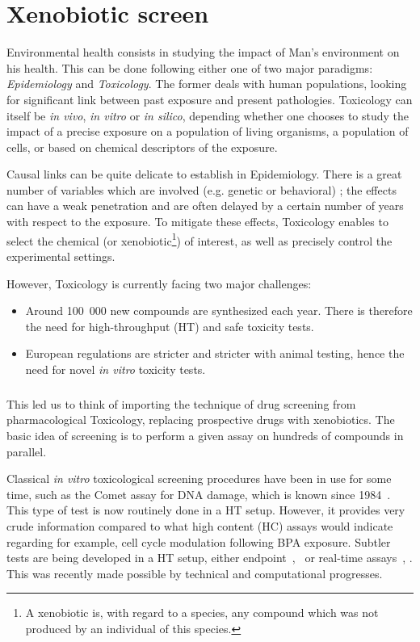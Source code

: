 
\chapter{Xenobiotic screen}

Environmental health consists in studying the impact of Man's environment on his health. This can be done following either one of two major paradigms: \textit{Epidemiology} and \textit{Toxicology}. The former deals with human populations, looking for significant link between past exposure and present pathologies. Toxicology can itself be \textit{in vivo}, \textit{in vitro} or \textit{in silico}, depending whether one chooses to study the impact of a precise exposure on a population of living organisms, a population of cells, or based on chemical descriptors of the exposure.

Causal links can be quite delicate to establish in Epidemiology. There is a great number of variables which are involved (e.g. genetic or behavioral) ; the effects can have a weak penetration and are often delayed by a certain number of years with respect to the exposure. To mitigate these effects, Toxicology enables to select the chemical (or xenobiotic\footnote{A xenobiotic is, with regard to a species, any compound which was not produced by an individual of this species.}) of interest, as well as precisely control the experimental settings.

However, Toxicology is currently facing two major challenges:
\begin{itemize}
\item Around 100~000 new compounds are synthesized each year. There is therefore the need for high-throughput (HT) and safe toxicity tests.
\item European regulations are stricter and stricter with animal testing, hence the need for novel \textit{in vitro} toxicity tests.
\end{itemize}
\paragraph*{}	
This led us to think of importing the technique of drug screening from pharmacological Toxicology, replacing prospective drugs with xenobiotics. The basic idea of screening is to perform a given assay on hundreds of compounds in parallel.

Classical \textit{in vitro} toxicological screening procedures have been in use for some time, such as the Comet assay for DNA damage, which is known since 1984~\cite{pmid6477583}. This type of test is now routinely done in a HT setup. However, it provides very crude information compared to what high content (HC) assays would indicate regarding for example, cell cycle modulation following BPA exposure. Subtler tests are being developed in a HT setup, either endpoint~\cite{pmid24772387},~\cite{pmid24610750} or real-time assays~\cite{pmid21516415}, \cite{pmid24141454}. This was recently made possible  by technical and computational progresses.

